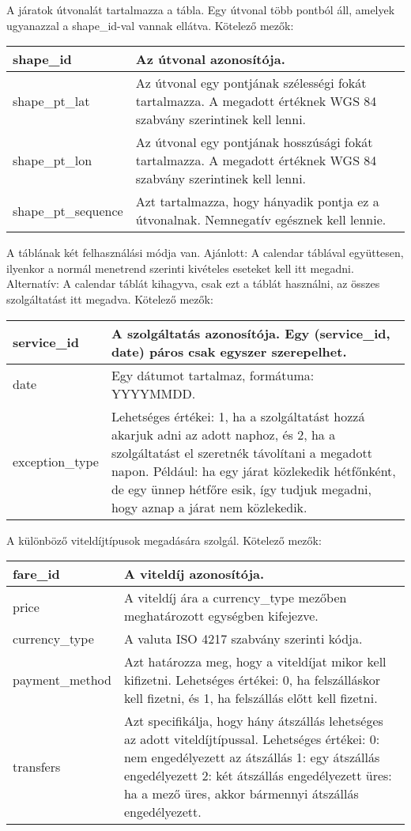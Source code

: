 A járatok útvonalát tartalmazza a tábla. Egy útvonal több pontból áll, amelyek ugyanazzal a shape\_id-val vannak ellátva.
Kötelező mezők:

\begin{tabular}{|p{3cm}|p{10cm}|}
\hline
shape\_id & Az útvonal azonosítója. \\
\hline
shape\_pt\_lat & Az útvonal egy pontjának szélességi fokát tartalmazza. A megadott értéknek WGS 84 szabvány szerintinek kell lenni. \\
\hline
shape\_pt\_lon & Az útvonal egy pontjának hosszúsági fokát tartalmazza. A megadott értéknek WGS 84 szabvány szerintinek kell lenni. \\
\hline
shape\_pt\_sequence & Azt tartalmazza, hogy hányadik pontja ez a útvonalnak. Nemnegatív egésznek kell lennie. \\
\hline
\end{tabular}


A táblának két felhasználási módja van.
Ajánlott: A calendar táblával együttesen, ilyenkor a normál menetrend szerinti kivételes eseteket kell itt megadni.
Alternatív: A calendar táblát kihagyva, csak ezt a táblát használni, az összes szolgáltatást itt megadva. 
Kötelező mezők:

\begin{tabular}{|p{3cm}|p{10cm}|}
\hline
service\_id & A szolgáltatás azonosítója. Egy (service\_id, date) páros csak egyszer szerepelhet. \\
\hline
date & Egy dátumot tartalmaz, formátuma: YYYYMMDD. \\
\hline
exception\_type & Lehetséges értékei:
1, ha a szolgáltatást hozzá akarjuk adni az adott naphoz, és
2, ha a szolgáltatást el szeretnék távolítani a megadott napon. Például: ha egy járat közlekedik hétfőnként, de egy ünnep hétfőre esik, így tudjuk megadni, hogy aznap a járat nem közlekedik. \\
\hline
\end{tabular}


A különböző viteldíjtípusok megadására szolgál.
Kötelező mezők:

\begin{tabular}{|p{3cm}|p{10cm}|}
\hline
fare\_id & A viteldíj azonosítója. \\
\hline
price & A viteldíj ára a currency\_type mezőben meghatározott egységben kifejezve. \\
\hline
currency\_type & A valuta ISO 4217 szabvány szerinti kódja. \\
\hline
payment\_method & Azt határozza meg, hogy a viteldíjat mikor kell kifizetni.
Lehetséges értékei:
0, ha felszálláskor kell fizetni, és
1, ha felszállás előtt kell fizetni. \\
\hline
transfers & Azt specifikálja, hogy hány átszállás lehetséges az adott viteldíjtípussal.
Lehetséges értékei:
0: nem engedélyezett az átszállás
1: egy átszállás engedélyezett
2: két átszállás engedélyezett
üres: ha a mező üres, akkor bármennyi átszállás engedélyezett. \\
\hline
\end{tabular}

